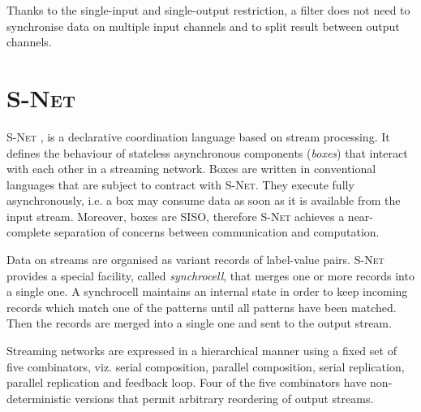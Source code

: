 Thanks to the single-input and single-output restriction, a filter does not need to synchronise data on multiple input channels and to split result between output channels.


    \section{\textsc{S-Net}}
\textsc{S-Net} \cite{snet_intro}, \cite{ceng_snet} is a declarative coordination language based on stream processing. It defines the behaviour of stateless asynchronous components (\emph{boxes}) that interact with each other in a streaming network. Boxes are written in conventional languages that are subject to contract with \textsc{S-Net}. They execute fully asynchronously, i.e. a box may consume data as soon as it is available from the input stream. Moreover, boxes are SISO, therefore \textsc{S-Net} achieves a near-complete separation of concerns between communication and computation.

Data on streams are organised as variant records of label-value pairs. \textsc{S-Net} provides a special facility, called \emph{synchrocell}, that merges one or more records into a single one. A synchrocell maintains an internal state in order to keep incoming records which match one of the patterns until all patterns have been matched. Then the records are merged into a single one and sent to the output stream.

Streaming networks are expressed in a hierarchical manner using a fixed set of five combinators, viz. serial composition, parallel composition, serial replication, parallel replication and feedback loop. Four of the five combinators have non-deterministic versions that permit arbitrary reordering of output streams.


